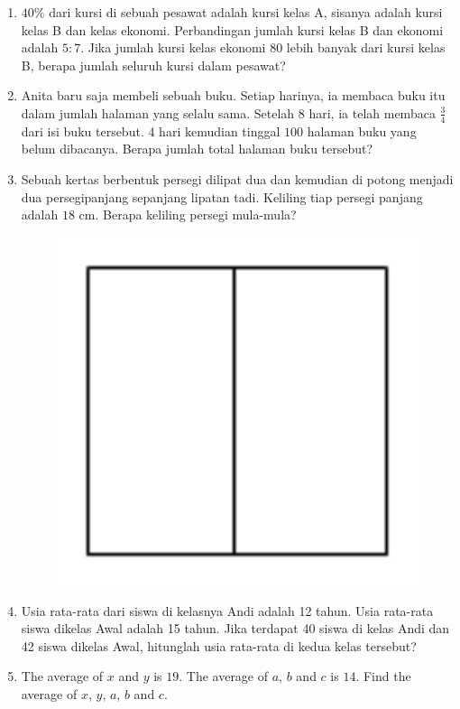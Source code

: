 \documentclass[11pt]{scrartcl}
\begin{document}
\begin{enumerate}
\begin{figure}[h]
    \label{fig:enter-label}
\end{figure}
\item $40\%$ dari kursi di sebuah pesawat adalah kursi kelas A, sisanya adalah kursi kelas B dan kelas ekonomi. Perbandingan jumlah kursi kelas B dan ekonomi adalah $5:7$. Jika jumlah kursi kelas ekonomi $80$ lebih banyak dari kursi kelas B, berapa jumlah seluruh kursi dalam pesawat?
\item Anita baru saja membeli sebuah buku. Setiap harinya, ia membaca buku itu dalam jumlah halaman yang selalu sama. Setelah $8$ hari, ia telah membaca $\frac{3}{4}$ dari isi buku tersebut. $4$ hari kemudian tinggal $100$ halaman buku yang belum dibacanya. Berapa jumlah total halaman buku tersebut?
\item Sebuah kertas berbentuk persegi dilipat dua dan kemudian di potong menjadi dua persegipanjang sepanjang lipatan tadi. Keliling tiap persegi panjang adalah $18$ cm. Berapa keliling persegi mula-mula?
\begin{figure}[h]
    \centering
    \includegraphics[scale=0.3]{Test For Pelatihan/TryOut OSN SD/persegiDibelah.png}
\label{fig:enter-label}
\end{figure}
\item Usia rata-rata dari siswa di kelasnya Andi adalah 12 tahun. Usia rata-rata siswa dikelas Awal adalah 15 tahun. Jika terdapat 40 siswa di kelas Andi dan 42 siswa dikelas Awal, hitunglah usia rata-rata di kedua kelas tersebut?

\item The average of $x$ and $y$ is $19$. The average of $a$, $b$ and $c$ is $14$. Find the average of $x$, $y$, $a$, $b$ and $c$. 


\end{enumerate}
\end{document}

